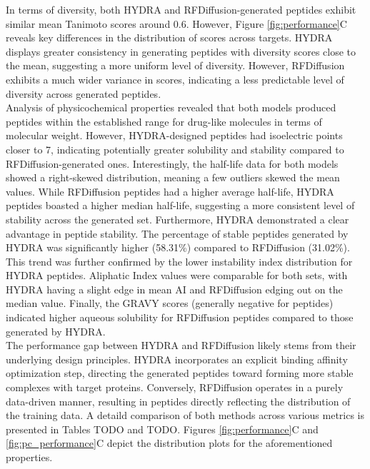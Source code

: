 In terms of diversity, both HYDRA and RFDiffusion-generated peptides exhibit similar mean Tanimoto scores around 0.6. However, Figure \ref{fig:performance}C reveals key differences in the distribution of scores across targets. HYDRA displays greater consistency in generating peptides with diversity scores close to the mean, suggesting a more uniform level of diversity. However, RFDiffusion exhibits a much wider variance in scores, indicating a less predictable level of diversity across generated peptides. \\

Analysis of physicochemical properties revealed that both models produced peptides within the established range for drug-like molecules in terms of molecular weight. However, HYDRA-designed peptides had isoelectric points closer to 7, indicating potentially greater solubility and stability compared to RFDiffusion-generated ones. Interestingly, the half-life data for both models showed a right-skewed distribution, meaning a few outliers skewed the mean values. While RFDiffusion peptides had a higher average half-life, HYDRA peptides boasted a higher median half-life, suggesting a more consistent level of stability across the generated set. Furthermore, HYDRA demonstrated a clear advantage in peptide stability. The percentage of stable peptides generated by HYDRA was significantly higher (58.31\%) compared to RFDiffusion (31.02\%). This trend was further confirmed by the lower instability index distribution for HYDRA peptides. Aliphatic Index values were comparable for both sets, with HYDRA having a slight edge in mean AI and RFDiffusion edging out on the median value. Finally, the GRAVY scores (generally negative for peptides) indicated higher aqueous solubility for RFDiffusion peptides compared to those generated by HYDRA. \\

The performance gap between HYDRA and RFDiffusion likely stems from their underlying design principles. HYDRA incorporates an explicit binding affinity optimization step, directing the generated peptides toward forming more stable complexes with target proteins. Conversely, RFDiffusion operates in a purely data-driven manner, resulting in peptides directly reflecting the distribution of the training data.
A detaild comparison of both methods across various metrics is presented in Tables TODO and TODO. Figures \ref{fig:performance}C and \ref{fig:pc_performance}C depict the distribution plots for the aforementioned properties.

